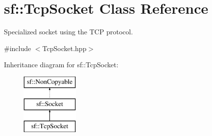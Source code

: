 \hypertarget{classsf_1_1_tcp_socket}{}\section{sf\+:\+:Tcp\+Socket Class Reference}
\label{classsf_1_1_tcp_socket}


Specialized socket using the T\+CP protocol.  




{\ttfamily \#include $<$Tcp\+Socket.\+hpp$>$}

Inheritance diagram for sf\+:\+:Tcp\+Socket\+:\begin{figure}[H]
\begin{center}
\leavevmode
\includegraphics[height=3.000000cm]{classsf_1_1_tcp_socket}
\end{center}
\end{figure}
